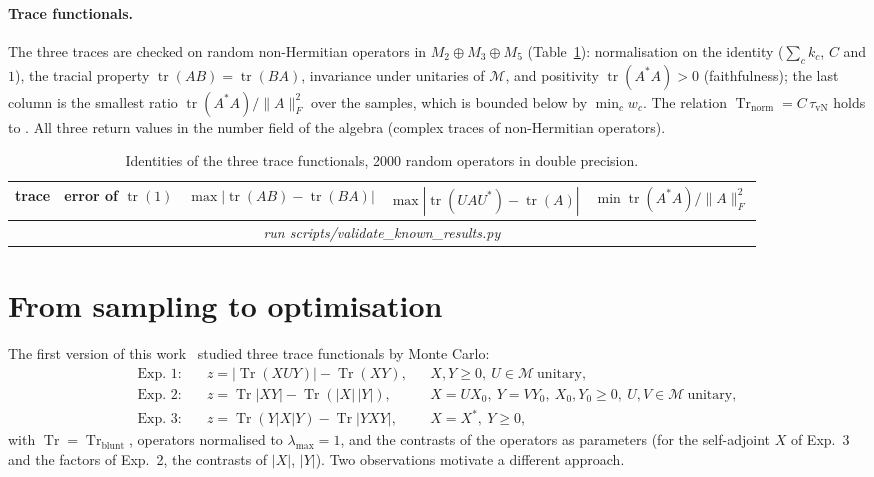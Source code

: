\documentclass[11pt]{article}
\DeclareMathOperator{\Tr}{Tr}
\newcommand{\M}{\mathcal{M}}
\providecommand{\ValTraceRows}{\multicolumn{5}{c}{\emph{run scripts/validate\_known\_results.py}}\\}
\begin{document}
\paragraph{Trace functionals.} The three traces are checked on random non-Hermitian operators in
$M_2\oplus M_3\oplus M_5$ (Table~\ref{tab:traces}): normalisation on the identity ($\sum_ck_c$, $C$ and $1$),
the tracial property $\operatorname{tr}(AB)=\operatorname{tr}(BA)$, invariance under unitaries of $\M$, and
positivity $\operatorname{tr}(A^*A)>0$ (faithfulness); the last column is the smallest ratio
$\operatorname{tr}(A^*A)/\|A\|_F^2$ over the samples, which is bounded below by $\min_cw_c$. The relation $\Tr_{\mathrm{norm}}=C\,\tau_{\mathrm{vN}}$ holds to
. All three return values
in the number field of the algebra (complex traces of non-Hermitian operators).

\begin{table}[h]
\centering\small
\begin{tabular}{lcccc}
\toprule
trace & error of $\operatorname{tr}(1)$ & $\max|\operatorname{tr}(AB)-\operatorname{tr}(BA)|$ &
$\max|\operatorname{tr}(UAU^*)-\operatorname{tr}(A)|$ & $\min\operatorname{tr}(A^*A)/\|A\|_F^2$\\
\midrule
\ValTraceRows
\bottomrule
\end{tabular}
\caption{Identities of the three trace functionals, 2000 random operators in double precision.}
\label{tab:traces}
\end{table}

\section{From sampling to optimisation}\label{sec:optimisation}

The first version of this work~\cite{v1} studied three trace functionals by Monte Carlo:
\begin{align*}
  \text{Exp.~1:}\quad & z=|\Tr(XUY)|-\Tr(XY), && X,Y\ge0,\ U\in\M\ \text{unitary},\\
  \text{Exp.~2:}\quad & z=\Tr|XY|-\Tr(|X|\,|Y|), && X=UX_0,\ Y=VY_0,\ X_0,Y_0\ge0,\ U,V\in\M\ \text{unitary},\\
  \text{Exp.~3:}\quad & z=\Tr(Y|X|Y)-\Tr|YXY|, && X=X^*,\ Y\ge0,
\end{align*}
with $\Tr=\Tr_{\mathrm{blunt}}$, operators normalised to $\lambda_{\max}=1$, and the contrasts of the
operators as parameters (for the self-adjoint $X$ of Exp.~3 and the factors of Exp.~2, the contrasts of $|X|$, $|Y|$). Two observations motivate a different approach.
\end{document}
